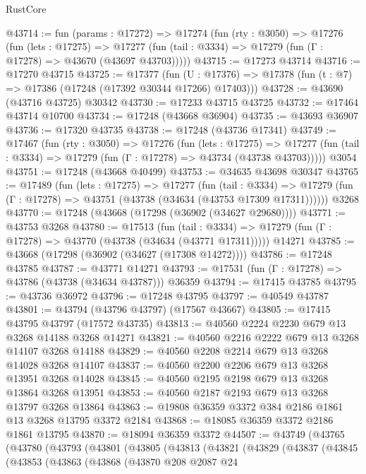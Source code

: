 \begin{lexlean}{RustCore}
\begin{coremodule}
@43714 := fun (params : @17272) =>
  @17274
    (fun (rty : @3050) =>
    @17276
      (fun (lets : @17275) =>
      @17277 (fun (tail : @3334) => @17279 (fun (Γ : @17278) => @43670 (@43697 @43703)))))
@43715 := @17273 @43714
@43716 := @17270 @43715
@43725 := @17377
    (fun (U : @17376) => @17378 (fun (t : @7) => @17386 (@17248 (@17392 @30344 @17266) @17403)))
@43728 := @43690 (@43716 @43725) @30342
@43730 := @17233 @43715 @43725
@43732 := @17464 @43714 @10700
@43734 := @17248 (@43668 @36904)
@43735 := @43693 @36907
@43736 := @17320 @43735
@43738 := @17248 (@43736 @17341)
@43749 := @17467
    (fun (rty : @3050) =>
    @17276
      (fun (lets : @17275) =>
      @17277 (fun (tail : @3334) => @17279 (fun (Γ : @17278) => @43734 (@43738 @43703)))))
    @3054
@43751 := @17248 (@43668 @40499)
@43753 := @34635 @43698 @30347
@43765 := @17489
    (fun (lets : @17275) =>
    @17277
      (fun (tail : @3334) =>
      @17279 (fun (Γ : @17278) => @43751 (@43738 (@34634 (@43753 @17309 @17311))))))
    @3268
@43770 := @17248 (@43668 (@17298 (@36902 (@34627 @29680))))
@43771 := @43753 @3268
@43780 := @17513
    (fun (tail : @3334) => @17279 (fun (Γ : @17278) => @43770 (@43738 (@34634 (@43771 @17311)))))
    @14271
@43785 := @43668 (@17298 (@36902 (@34627 (@17308 @14272))))
@43786 := @17248 @43785
@43787 := @43771 @14271
@43793 := @17531 (fun (Γ : @17278) => @43786 (@43738 (@34634 @43787))) @36359
@43794 := @17415 @43785
@43795 := @43736 @36972
@43796 := @17248 @43795
@43797 := @40549 @43787
@43801 := @43794 (@43796 @43797) (@17567 @43667)
@43805 := @17415 @43795 @43797 (@17572 @43735)
@43813 := @40560 @2224 @2230 @679 @13 @3268 @14188 @3268 @14271
@43821 := @40560 @2216 @2222 @679 @13 @3268 @14107 @3268 @14188
@43829 := @40560 @2208 @2214 @679 @13 @3268 @14028 @3268 @14107
@43837 := @40560 @2200 @2206 @679 @13 @3268 @13951 @3268 @14028
@43845 := @40560 @2195 @2198 @679 @13 @3268 @13864 @3268 @13951
@43853 := @40560 @2187 @2193 @679 @13 @3268 @13797 @3268 @13864
@43863 := @19808 @36359 @3372 @384 @2186 @1861 @13 @3268 @13795 @3372 @2184
@43868 := @18085 @36359 @3372 @2186 @1861 @13795
@43870 := @18094 @36359 @3372
@44507 := @43749
    (@43765
      (@43780
        (@43793
          (@43801
            (@43805
              (@43813
                (@43821
                  (@43829
                    (@43837
                      (@43845
                        (@43853
                          (@43863
                            (@43868
                              (@43870
                                @208
                                @2087
                                @24

\end{coremodule}
\end{lexlean}
